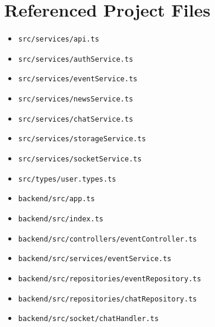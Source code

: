 \documentclass[12pt,a4paper]{article}
\begin{document}
\section{Referenced Project Files}
\begin{itemize}
  \item \texttt{src/services/api.ts}
  \item \texttt{src/services/authService.ts}
  \item \texttt{src/services/eventService.ts}
  \item \texttt{src/services/newsService.ts}
  \item \texttt{src/services/chatService.ts}
  \item \texttt{src/services/storageService.ts}
  \item \texttt{src/services/socketService.ts}
  \item \texttt{src/types/user.types.ts}
  \item \texttt{backend/src/app.ts}
  \item \texttt{backend/src/index.ts}
  \item \texttt{backend/src/controllers/eventController.ts}
  \item \texttt{backend/src/services/eventService.ts}
  \item \texttt{backend/src/repositories/eventRepository.ts}
  \item \texttt{backend/src/repositories/chatRepository.ts}
  \item \texttt{backend/src/socket/chatHandler.ts}
\end{itemize}
\end{document}
